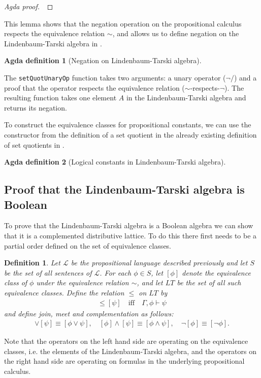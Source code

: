 \documentclass[titlepage]{article}
\newtheorem{definition}{Definition}[section]
\newtheorem{agdadef}{Agda definition}
\begin{document}
\begin{proof}[Agda proof]
    $\:$
\end{proof}

This lemma shows that the negation operation on the propositional calculus respects the equivalence relation $\sim$, and allows us to define negation on the Lindenbaum-Tarski algebra in \CubicalAgda.

\begin{agdadef}[Negation on Lindenbaum-Tarski algebra]$ $
\end{agdadef}


The \texttt{setQuotUnaryOp} function takes two arguments: a unary operator ($\neg/$) and a proof that the operator respects the equivalence relation ($\sim$-respects-$\neg$). The resulting function takes one element $A$ in the Lindenbaum-Tarski algebra and returns its negation.

To construct the equivalence classes for propositional constants, we can use the constructor from the definition of a set quotient in the already existing definition of set quotients in \CubicalAgda.

\begin{agdadef}[Logical constants in Lindenbaum-Tarski algebra]$ $
\end{agdadef}


\subsection{Proof that the Lindenbaum-Tarski algebra is Boolean}

To prove that the Lindenbaum-Tarski algebra is a Boolean algebra we can show that it is a complemented distributive lattice. To do this there first needs to be a partial order defined on the set of equivalence classes.
\begin{definition}\label{order-relation}
    Let $\mathcal{L}$ be the propositional language described previously and let $S$ be the set of all sentences of $\mathcal{L}$. For each $\phi \in S$, let $[\phi]$ denote the equivalence class of $\phi$ under the equivalence relation $\sim$, and let $LT$ be the set of all such equivalence classes. Define the relation $\leq$ on $LT$ by
    \begin{align*}
        [\phi] \leq [\psi] \quad \text{iff} \quad \Gamma, \phi \vdash \psi
    \end{align*}
    and define join, meet and complementation as follows:
    \begin{align*}
        [\phi] \vee [\psi] \equiv [\phi \vee \psi], \quad [\phi] \wedge [\psi] \equiv [\phi \wedge \psi], \quad \neg[\phi] \equiv [\neg \phi].
    \end{align*}
\end{definition}
Note that the operators on the left hand side are operating on the equivalence classes, i.e. the elements of the Lindenbaum-Tarski algebra, and the operators on the right hand side are operating on formulas in the underlying propositional calculus.
\end{document}
